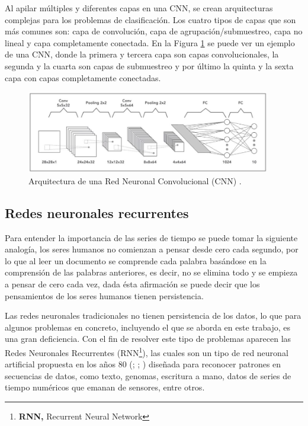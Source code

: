 \vspace{5mm} %

Al apilar múltiples y diferentes capas en una CNN, se crean arquitecturas complejas para los problemas de clasificación. Los cuatro tipos de capas que son más comunes son: capa de convolución, capa de agrupación/submuestreo, capa no lineal y capa completamente conectada. En la Figura \ref{fig:cnn} se puede ver un ejemplo de una CNN, donde la primera y tercera capa son capas convolucionales, la segunda y la cuarta son capas de submuestreo y por \'{u}ltimo la quinta y la sexta capa con capas completamente conectadas. 

\begin{figure}[h!]
  \begin{center}	\includegraphics[width=0.95\textwidth]{imagenes/Cap4/cnn}
  \caption{Arquitectura de una Red Neuronal Convolucional (CNN) \protect\cite{Reference71}.}
  \label{fig:cnn}
  \end{center}
\end{figure}

\subsection{Redes neuronales recurrentes}

Para entender la importancia de las series de tiempo se puede tomar la siguiente analog\'{i}a, los seres humanos no comienzan a pensar desde cero cada segundo, por lo que al leer un documento se comprende cada palabra bas\'{a}ndose en la comprensi\'{o}n de las palabras anteriores, es decir, no se elimina todo y se empieza a pensar de cero cada vez, dada \'{e}sta afirmaci\'{o}n se puede decir que los pensamientos de los seres humanos tienen persistencia.

\vspace{5mm} %

Las redes neuronales tradicionales no tienen persistencia de los datos, lo que para algunos problemas en concreto, incluyendo el que se aborda en este trabajo, es una gran deficiencia. Con el fin de resolver este tipo de problemas aparecen las Redes Neuronales Recurrentes (RNN\footnote{\textbf{RNN,} Recurrent Neural Network}), las cuales son un tipo de red neuronal artificial propuesta en los a\~{n}os 80 (; ; ) dise\~{n}ada para reconocer patrones en secuencias de datos, como texto, genomas, escritura a mano, datos de series de tiempo num\'{e}ricos que emanan de sensores, entre otros.

